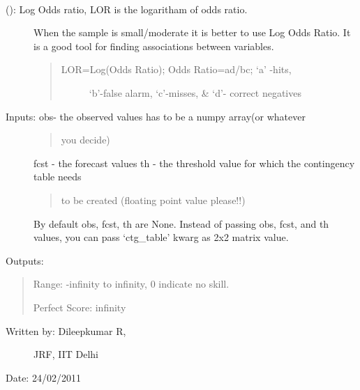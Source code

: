 \documentclass[letterpaper,10pt,english]{sphinxmanual}
\begin{document}
\begin{fulllineitems}
\label{diagnosis:ctgfunction.logodr}~\begin{description}
\item[{{\hyperref[diagnosis:ctgfunction.logodr]{}} (): Log Odds ratio, LOR is the logaritham of odds ratio.}] \leavevmode
When the sample is small/moderate it is better to use Log
Odds Ratio. It is a good tool for finding associations
between variables.
\begin{quote}
\begin{description}
\item[{LOR=Log(Odds Ratio); Odds Ratio=ad/bc; `a' -hits,}] \leavevmode
`b'-false alarm, `c'-misses, \& `d'- correct negatives

\end{description}
\end{quote}

\item[{Inputs: obs- the observed values has to be a numpy array(or whatever}] \leavevmode\begin{quote}

you decide)
\end{quote}

fcst - the forecast values
th  - the threshold value for which the contingency table needs
\begin{quote}

to be created (floating point value please!!)
\end{quote}

By default obs, fcst, th are None. Instead of passing obs, fcst,
and th values, you can pass `ctg\_table' kwarg as 2x2 matrix value.

\end{description}

Outputs:
\begin{quote}

Range: -infinity to infinity, 0 indicate no skill.

Perfect Score: infinity
\end{quote}
\begin{description}
\item[{Written by: Dileepkumar R,}] \leavevmode
JRF, IIT Delhi

\end{description}

Date: 24/02/2011

\end{fulllineitems}
\end{document}
